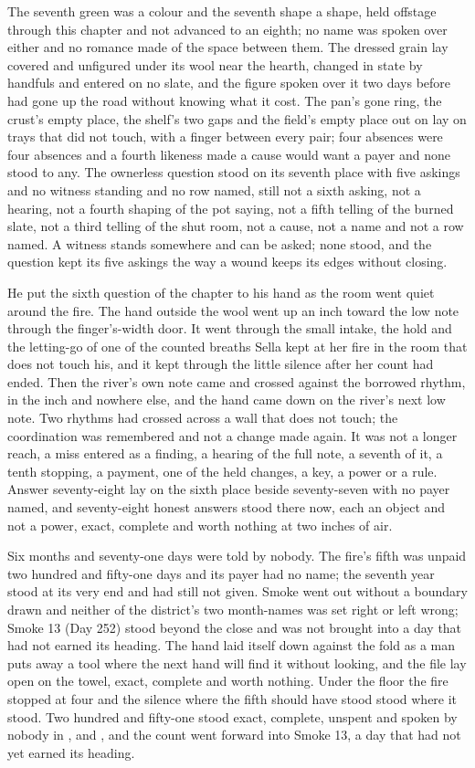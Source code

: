 The seventh green was a colour and the seventh shape a shape, held offstage through this chapter and not advanced to an eighth; no name was spoken over either and no romance made of the space between them. The dressed grain lay covered and unfigured under its wool near the hearth, changed in state by handfuls and entered on no slate, and the figure spoken over it two days before had gone up the road without knowing what it cost. The pan's gone ring, the crust's empty place, the shelf's two gaps and the field's empty place out on  lay on trays that did not touch, with a finger between every pair; four absences were four absences and a fourth likeness made a cause would want a payer and none stood to any. The ownerless question stood on its seventh place with five askings and no witness standing and no row named, still not a sixth asking, not a hearing, not a fourth shaping of the pot saying, not a fifth telling of the burned slate, not a third telling of the shut room, not a cause, not a name and not a row named. A witness stands somewhere and can be asked; none stood, and the question kept its five askings the way a wound keeps its edges without closing.

\scenebreak

He put the sixth question of the chapter to his hand as the room went quiet around the fire. The hand outside the wool went up an inch toward the low note through the finger's-width door. It went through the small intake, the hold and the letting-go of one of the counted breaths Sella kept at her fire in the room that does not touch his, and it kept through the little silence after her count had ended. Then the river's own note came and crossed against the borrowed rhythm, in the inch and nowhere else, and the hand came down on the river's next low note. Two rhythms had crossed across a wall that does not touch; the coordination was remembered and not a change made again. It was not a longer reach, a miss entered as a finding, a hearing of the full note, a seventh of it, a tenth stopping, a payment, one of the held changes, a key, a power or a rule. Answer seventy-eight lay on the sixth place beside seventy-seven with no payer named, and seventy-eight honest answers stood there now, each an object and not a power, exact, complete and worth nothing at two inches of air.

Six months and seventy-one days were told by nobody. The fire's fifth was unpaid two hundred and fifty-one days and its payer had no name; the seventh year stood at its very end and had still not given. Smoke went out without a boundary drawn and neither of the district's two month-names was set right or left wrong; Smoke 13 (Day 252) stood beyond the close and was not brought into a day that had not earned its heading. The hand laid itself down against the fold as a man puts away a tool where the next hand will find it without looking, and the file lay open on the towel, exact, complete and worth nothing. Under the floor the fire stopped at four and the silence where the fifth should have stood stood where it stood. Two hundred and fifty-one stood exact, complete, unspent and spoken by nobody in ,  and , and the count went forward into Smoke 13, a day that had not yet earned its heading.
